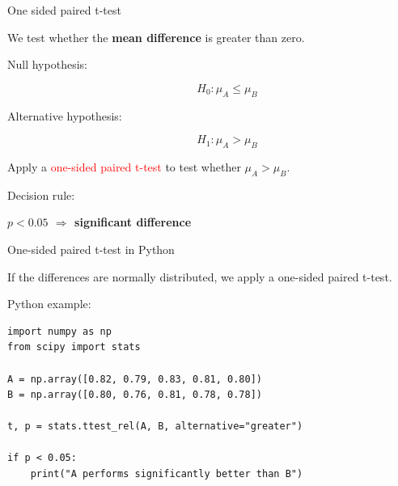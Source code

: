 \documentclass{beamer} %
\begin{document}
\begin{frame}{One sided paired t-test}

We test whether the \textbf{mean difference} is greater than zero.
\bigskip
\begin{description}
\item[Null hypothesis:]

\[
H_0 : \mu_A \le \mu_B
\]

\item[Alternative hypothesis:]
\[
H_1 : \mu_A > \mu_B
\]
\end{description}

\bigskip
Apply a \textcolor{red}{one-sided paired t-test} to test whether $\mu_A > \mu_B$.

\bigskip

Decision rule:

\begin{center}
\textbf{$p < 0.05$ $\Rightarrow$ significant difference}
\end{center}

\end{frame}


\begin{frame}[fragile]{One-sided paired t-test in Python}

If the differences are normally distributed, we apply a one-sided paired t-test.

\bigskip

Python example:

\begin{lstlisting}
import numpy as np
from scipy import stats

A = np.array([0.82, 0.79, 0.83, 0.81, 0.80])
B = np.array([0.80, 0.76, 0.81, 0.78, 0.78])

t, p = stats.ttest_rel(A, B, alternative="greater")

if p < 0.05:
    print("A performs significantly better than B")
\end{lstlisting}

\end{frame}

\end{document}
